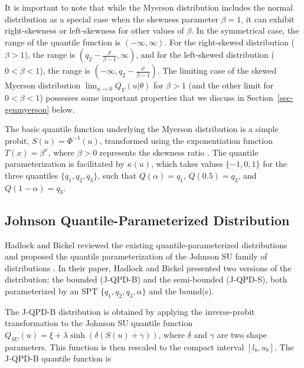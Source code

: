 \documentclass[
  fleqn,
  deca,
  blindrev
]{informs4}
\begin{document}
It is important to note that while the Myerson distribution includes the
normal distribution as a special case when the skewness parameter
\(\beta = 1\), it can exhibit right-skewness or left-skewness for other
values of \(\beta\). In the symmetrical case, the range of the quantile
function is \((-\infty, \infty)\). For the right-skewed distribution
(\(\beta > 1\)), the range is
\((q_2 - \frac{\rho}{\beta - 1}, \infty)\), and for the left-skewed
distribution (\(0 < \beta < 1\)), the range is
\((-\infty, q_2 - \frac{\rho}{\beta - 1})\). The limiting case of the
skewed Myerson distribution \(\lim_{u \rightarrow 0} Q_Y(u\vert\theta)\)
for \(\beta > 1\) (and the other limit for \(0 < \beta < 1\)) possesses
some important properties that we discuss in
Section~\ref{sec-genmyerson} below.

The basic quantile function
\citep{gilchrist2000StatisticalModellingQuantile, lampasi2008AlternativeApproachMeasurement}
underlying the Myerson distribution is a simple probit,
\(S(u) = \Phi^{-1}(u)\), transformed using the exponentiation function
\(T(x) = \beta^{x}\), where \(\beta > 0\) represents the skewness ratio
\citep{gilchrist2000StatisticalModellingQuantile}. The quantile
parameterization is facilitated by \(\kappa(u)\), which takes values
\(\{-1,0,1\}\) for the three quantiles \(\{q_1, q_2, q_3\}\), such that
\(Q(\alpha) = q_1\), \(Q(0.5) = q_2\), and \(Q(1 - \alpha) = q_3\).

\subsection{Johnson Quantile-Parameterized
Distribution}\label{johnson-quantile-parameterized-distribution}

Hadlock and Bickel
\citep{hadlock2017QuantileparameterizedMethodsQuantifying} reviewed the
existing quantile-parameterized distributions and proposed the quantile
parameterization of the Johnson SU family of distributions
\citep{johnson1994ContinuousUnivariateDistributions}. In their paper,
Hadlock and Bickel
\citep{hadlock2017JohnsonQuantileParameterizedDistributions} presented
two versions of the distribution: the bounded (J-QPD-B) and the
semi-bounded (J-QPD-S), both parameterized by an SPT
\(\{q_1, q_2, q_3, \alpha\}\) and the bound(s).

The J-QPD-B distribution is obtained by applying the inverse-probit
transformation to the Johnson SU quantile function
\(Q_{SU}(u) = \xi + \lambda\sinh(\delta(S(u) + \gamma))\), where
\(\delta\) and \(\gamma\) are two shape parameters. This function is
then rescaled to the compact interval \([l_b, u_b]\). The J-QPD-B
quantile function is
\end{document}
